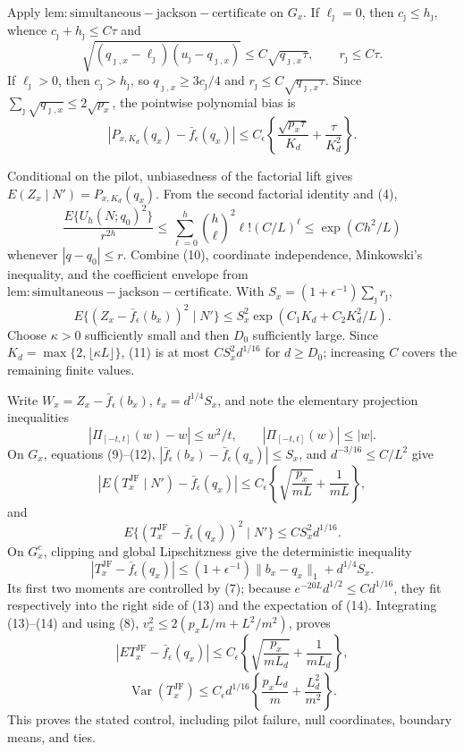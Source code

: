 Apply \(\mathrm{lem:simultaneous-jackson-certificate}\) on \(G_x\).  If \(\ell_\jmath=0\), then \(c_\jmath\leq h_\jmath\), whence \(c_\jmath+ h_\jmath\leq C\tau\) and
\[
 \sqrt{(q_{\jmath,x}-\ell_\jmath)(u_\jmath-q_{\jmath,x})}
 \leq C\sqrt{q_{\jmath,x}\tau},\qquad r_\jmath\leq C\tau.
\]
If \(\ell_\jmath>0\), then \(c_\jmath>h_\jmath\), so \(q_{\jmath,x}\geq3c_\jmath/4\) and \(r_\jmath\leq C\sqrt{q_{\jmath,x}\tau}\).  Since \(\sum_\jmath\sqrt{q_{\jmath,x}}\leq2\sqrt{p_x}\), the pointwise polynomial bias is
\[
 |P_{x,K_d}(q_x)-\bar f_\epsilon(q_x)|
 \leq C_\epsilon\left\{\frac{\sqrt{p_x\tau}}{K_d}+\frac{\tau}{K_d^2}\right\}. \tag{9}
\]

Conditional on the pilot, unbiasedness of the factorial lift gives \(E(Z_x\mid N')=P_{x,K_d}(q_x)\).  From the second factorial identity and (4),
\[
 \frac{E\{U_h(N;q_0)^2\}}{r^{2h}}
 \leq\sum_{\ell=0}^h\binom h\ell^2\ell!(C/L)^\ell
 \leq\exp(Ch^2/L)                                                     \tag{10}
\]
whenever \(|q-q_0|\leq r\).  Combine (10), coordinate independence, Minkowski's inequality, and the coefficient envelope from \(\mathrm{lem:simultaneous-jackson-certificate}\).  With \(S_x=(1+\epsilon^{-1})\sum_\jmath r_\jmath\),
\[
 E\{(Z_x-\bar f_\epsilon(b_x))^2\mid N'\}
 \leq S_x^2\exp(C_1K_d+C_2K_d^2/L).                                  \tag{11}
\]
Choose \(\kappa>0\) sufficiently small and then \(D_0\) sufficiently large.  Since \(K_d=\max\{2,\lfloor\kappa L\rfloor\}\), (11) is at most \(C S_x^2d^{1/16}\) for \(d\geq D_0\); increasing \(C\) covers the remaining finite values.

Write \(W_x=Z_x-\bar f_\epsilon(b_x)\), \(t_x=d^{1/4}S_x\), and note the elementary projection inequalities
\[
 |\Pi_{[-t,t]}(w)-w|\leq w^2/t,\qquad |\Pi_{[-t,t]}(w)|\leq|w|.       \tag{12}
\]
On \(G_x\), equations (9)--(12), \(|\bar f_\epsilon(b_x)-\bar f_\epsilon(q_x)|\leq S_x\), and \(d^{-3/16}\leq C/L^2\) give
\[
 |E(T_x^{\mathrm{JF}}\mid N')-\bar f_\epsilon(q_x)|
 \leq C_\epsilon\left\{\sqrt{\frac{p_x}{mL}}+\frac1{mL}\right\}, \tag{13}
\]
and
\[
 E\{(T_x^{\mathrm{JF}}-\bar f_\epsilon(q_x))^2\mid N'\}
 \leq C S_x^2d^{1/16}.                                                 \tag{14}
\]
On \(G_x^c\), clipping and global Lipschitzness give the deterministic inequality
\[
 |T_x^{\mathrm{JF}}-\bar f_\epsilon(q_x)|
 \leq(1+\epsilon^{-1})\|b_x-q_x\|_1+d^{1/4}S_x.
\]
Its first two moments are controlled by (7); because \(e^{-20L}d^{1/2}\leq Cd^{1/16}\), they fit respectively into the right side of (13) and the expectation of (14).  Integrating (13)--(14) and using (8), \(v_x^2\leq2(p_xL/m+L^2/m^2)\), proves
\[
 |E T_x^{\mathrm{JF}}-\bar f_\epsilon(q_x)|
 \leq C_\epsilon\left\{\sqrt{\frac{p_x}{mL_d}}+\frac1{mL_d}\right\},
\]
\[
 \operatorname{Var}(T_x^{\mathrm{JF}})
 \leq C_\epsilon d^{1/16}\left\{\frac{p_xL_d}{m}+\frac{L_d^2}{m^2}\right\}.
\]
This proves the stated control, including pilot failure, null coordinates, boundary means, and ties.
